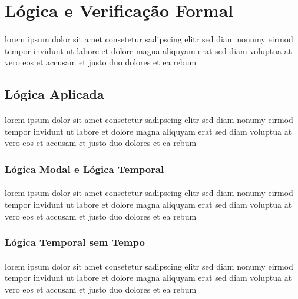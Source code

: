 \paragraph{}
\lipsum[1]


\section{Lógica e Verificação Formal}
\paragraph{}
lorem ipsum dolor sit amet consetetur sadipscing elitr sed diam nonumy
eirmod tempor invidunt ut labore et dolore magna aliquyam erat sed diam
voluptua at vero eos et accusam et justo duo dolores et ea rebum

\subsection{Lógica Aplicada}
\paragraph{}
lorem ipsum dolor sit amet consetetur sadipscing elitr sed diam nonumy
eirmod tempor invidunt ut labore et dolore magna aliquyam erat sed diam
voluptua at vero eos et accusam et justo duo dolores et ea rebum

\subsubsection{Lógica Modal e Lógica Temporal}
\paragraph{}
lorem ipsum dolor sit amet consetetur sadipscing elitr sed diam nonumy
eirmod tempor invidunt ut labore et dolore magna aliquyam erat sed diam
voluptua at vero eos et accusam et justo duo dolores et ea rebum

\subsubsection{Lógica Temporal sem Tempo}
\paragraph{}
lorem ipsum dolor sit amet consetetur sadipscing elitr sed diam nonumy
eirmod tempor invidunt ut labore et dolore magna aliquyam erat sed diam
voluptua at vero eos et accusam et justo duo dolores et ea rebum

